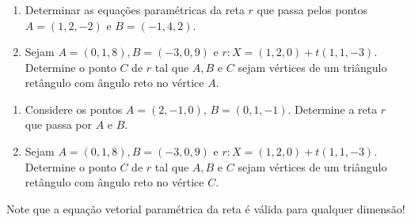 \begin{frame}[label=retas]
	\frametitle{ }
	{\begin{exe}\label{exer4} \noindent
			
			\begin{enumerate}[a]
				
				\item Determinar  as equações paramétricas da reta $r$ que passa pelos
				pontos $A = (1, 2, -2)$ e $B = (-1, 4, 2)$.

	\item\label{ex6} Sejam $A=(0,1,8), B=(-3,0,9)$ e $r: X=(1,2,0)+t(1,1,-3)$. Determine o ponto $C$ de $r$ tal que $A,B$ e $C$ sejam vértices de um triângulo retângulo com ângulo reto no vértice $A$.
			\end{enumerate}
	\end{exe}}

\end{frame}

\begin{frame}[label=retas]
	\begin{casa}
	\begin{enumerate}
		\item 	Considere os pontos $A = (2, -1, 0)$,  $B  = (0, 1, -1)$. Determine
	 a reta $r$ que passa por $A$ e $B$.

	\item Sejam $A=(0,1,8), B=(-3,0,9)$ e $r: X=(1,2,0)+t(1,1,-3)$. Determine o ponto $C$ de $r$ tal que $A,B$ e $C$ sejam vértices de um triângulo retângulo com ângulo reto no vértice $C$. 
	\end{enumerate}
	
	\end{casa}

	
\begin{center}
\begin{block}{}
Note que a equação vetorial paramétrica da reta é válida para qualquer dimensão!
\end{block}
\end{center}
\end{frame}

